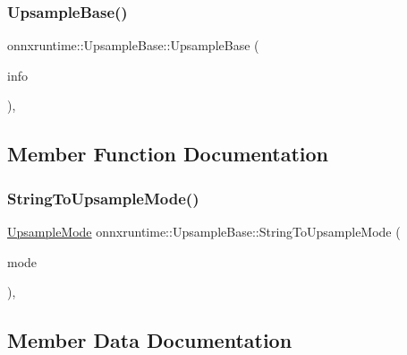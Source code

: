 \subsubsection{\texorpdfstring{Upsample\+Base()}{UpsampleBase()}}
{\footnotesize\ttfamily onnxruntime\+::\+Upsample\+Base\+::\+Upsample\+Base (\begin{DoxyParamCaption}\item[{\mbox{\hyperlink{classonnxruntime_1_1OpKernelInfo}{Op\+Kernel\+Info}}}]{info }\end{DoxyParamCaption})\hspace{0.3cm}{\ttfamily [inline]}, {\ttfamily [protected]}}



\subsection{Member Function Documentation}
\mbox{\label{classonnxruntime_1_1UpsampleBase_a75a5c95280ba6b81fbde77febba4f526}} 
\subsubsection{\texorpdfstring{String\+To\+Upsample\+Mode()}{StringToUpsampleMode()}}
{\footnotesize\ttfamily \mbox{\hyperlink{namespaceonnxruntime_ac1731b73e10b6a91015c32c7e29d03bd}{Upsample\+Mode}} onnxruntime\+::\+Upsample\+Base\+::\+String\+To\+Upsample\+Mode (\begin{DoxyParamCaption}\item[{const std\+::string \&}]{mode }\end{DoxyParamCaption})\hspace{0.3cm}{\ttfamily [inline]}, {\ttfamily [protected]}}



\subsection{Member Data Documentation}
\mbox{\label{classonnxruntime_1_1UpsampleBase_a82cf1a1cc2cc235e48febda998449102}} 
